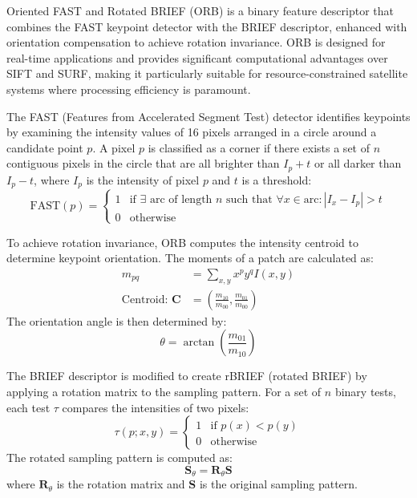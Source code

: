 
Oriented FAST and Rotated BRIEF (ORB) is a binary feature descriptor that combines the FAST keypoint detector with the BRIEF descriptor, 
enhanced with orientation compensation to achieve rotation invariance. ORB is designed for real-time applications and provides significant computational 
advantages over SIFT and SURF, making it particularly suitable for resource-constrained satellite systems where processing efficiency is paramount.

The FAST (Features from Accelerated Segment Test) detector identifies keypoints by examining the intensity values of 16 pixels arranged in a circle around 
a candidate point $p$. A pixel $p$ is classified as a corner if there exists a set of $n$ contiguous pixels in the circle that are all brighter than $I_p + t$ or 
all darker than $I_p - t$, where $I_p$ is the intensity of pixel $p$ and $t$ is a threshold:
\begin{equation}
\text{FAST}(p) = \begin{cases}
1 & \text{if } \exists \text{ arc of length } n \text{ such that } \forall x \in \text{arc}: |I_x - I_p| > t \\
0 & \text{otherwise}
\end{cases}
\end{equation}

To achieve rotation invariance, ORB computes the intensity centroid to determine keypoint orientation. The moments of a patch are calculated as:
\begin{align}
m_{pq} &= \sum_{x,y} x^p y^q I(x,y) \\
\text{Centroid: } \mathbf{C} &= \left(\frac{m_{10}}{m_{00}}, \frac{m_{01}}{m_{00}}\right)
\end{align}
The orientation angle is then determined by:
\begin{equation}
\theta = \arctan\left(\frac{m_{01}}{m_{10}}\right)
\end{equation}

The BRIEF descriptor is modified to create rBRIEF (rotated BRIEF) by applying a rotation matrix to the sampling pattern. For a set of $n$ binary tests, 
each test $\tau$ compares the intensities of two pixels:
\begin{equation}
\tau(p; x, y) = \begin{cases}
1 & \text{if } p(x) < p(y) \\
0 & \text{otherwise}
\end{cases}
\end{equation}
The rotated sampling pattern is computed as:
\begin{equation}
\mathbf{S}_{\theta} = \mathbf{R}_{\theta} \mathbf{S}
\end{equation}
where $\mathbf{R}_{\theta}$ is the rotation matrix and $\mathbf{S}$ is the original sampling pattern.

